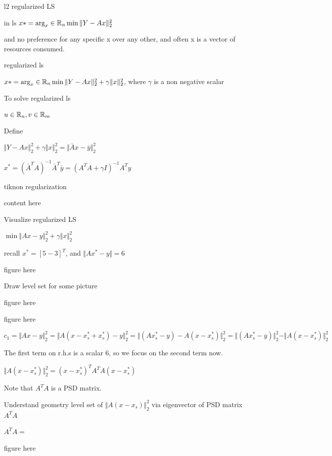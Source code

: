 l2 regularized LS

in ls $x*=\arg_x\in\mathbb{R}_{n} \min \Vert Y-Ax\Vert ^2_2$

and no preference for any specific x over any other, and often x is a vector of resources consumed.

regularized ls

$x*=\arg_x\in\mathbb{R}_{n} \min \Vert Y-Ax\Vert ^2_2 + \gamma \Vert x\Vert ^2_2$, where $\gamma$ is a non negative scalar


To solve regularized ls

$u\in\mathbb{R}_{n}, v\in\mathbb{R}_{m}$


Define


$\Vert Y-Ax\Vert ^2_2 + \gamma \Vert x\Vert ^2_2=\Vert \bar{A}x-\bar{y}\Vert^2_2$

$x^*=(\bar{A}^TA)^{-1}\bar{A}^T\bar{y}=(A^TA+\gamma I)^{-1}A^Ty$


tiknon regularization

content here


Visualize regularized LS

$\min \Vert Ax-y\Vert_2^2 +\gamma\Vert x\Vert^2_2$

recall $x^*=[5 -3]^T$, and $\Vert Ax^*-y\Vert = 6$

figure here


Draw level set for some picture

figure here

figure here



$c_1=\Vert Ax-y\Vert^2_2=\Vert A(x-x_s^*+x_s^*)-y\Vert^2_2=\Vert (Ax_s^*-y)-A(x-x_s^*)\Vert^2_2=\Vert (Ax_s^*-y)\Vert^2_2 - \Vert A(x-x_s^*)\Vert^2_2$

The first term on r.h.s is a scalar 6, so we focus on the second term now.

$\Vert A(x-x_s^*)\Vert^2_2= (x-x_s^*)^T A^TA (x-x_s^*)$ 

Note that $A^TA$ is a PSD matrix.


Understand geometry level set of $\Vert A(x-x_s)\Vert^2_2$ via eigenvector of PSD matrix $A^TA$


$A^TA=$

figure here

















